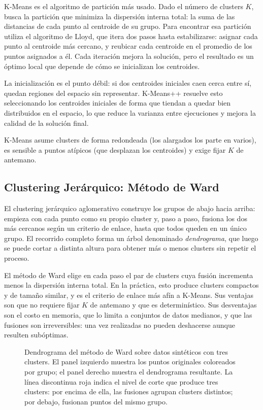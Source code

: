 K-Means es el algoritmo de partición más usado. Dado el número de clusters $K$, busca la partición que minimiza la dispersión interna total: la suma de las distancias de cada punto al centroide de su grupo. Para encontrar esa partición utiliza el algoritmo de Lloyd, que itera dos pasos hasta estabilizarse: asignar cada punto al centroide más cercano, y reubicar cada centroide en el promedio de los puntos asignados a él. Cada iteración mejora la solución, pero el resultado es un óptimo local que depende de cómo se inicializan los centroides.

La inicialización es el punto débil: si dos centroides iniciales caen cerca entre sí, quedan regiones del espacio sin representar. K-Means++ \parencite{arthur_2007_kmeans_plus_plus} resuelve esto seleccionando los centroides iniciales de forma que tiendan a quedar bien distribuidos en el espacio, lo que reduce la varianza entre ejecuciones y mejora la calidad de la solución final.

K-Means asume clusters de forma redondeada (los alargados los parte en varios), es sensible a puntos atípicos (que desplazan los centroides) y exige fijar $K$ de antemano.

\subsection{Clustering Jerárquico: Método de Ward}
\label{subsec:ward}

El clustering jerárquico aglomerativo construye los grupos de abajo hacia arriba: empieza con cada punto como su propio cluster y, paso a paso, fusiona los dos más cercanos según un criterio de enlace, hasta que todos queden en un único grupo. El recorrido completo forma un árbol denominado \textit{dendrograma}, que luego se puede cortar a distinta altura para obtener más o menos clusters sin repetir el proceso.

El método de Ward \parencite{ward_1963_hierarchical} elige en cada paso el par de clusters cuya fusión incrementa menos la dispersión interna total. En la práctica, esto produce clusters compactos y de tamaño similar, y es el criterio de enlace más afín a K-Means. 
Sus ventajas son que no requiere fijar $K$ de antemano y que es determinístico. Sus desventajas son el costo en memoria, que lo limita a conjuntos de datos medianos, y que las fusiones son irreversibles: una vez realizadas no pueden deshacerse aunque resulten subóptimas.

\begin{figure}[htbp]
    \centering
    \resizebox{\textwidth}{!}{}
    \caption[Dendrograma del método de Ward sobre datos sintéticos.]{Dendrograma del método de Ward sobre datos sintéticos con tres clusters. El panel izquierdo muestra los puntos originales coloreados por grupo; el panel derecho muestra el dendrograma resultante. La línea discontinua roja indica el nivel de corte que produce tres clusters: por encima de ella, las fusiones agrupan clusters distintos; por debajo, fusionan puntos del mismo grupo.}
    \label{fig:clustering-dendrogram}
\end{figure}



